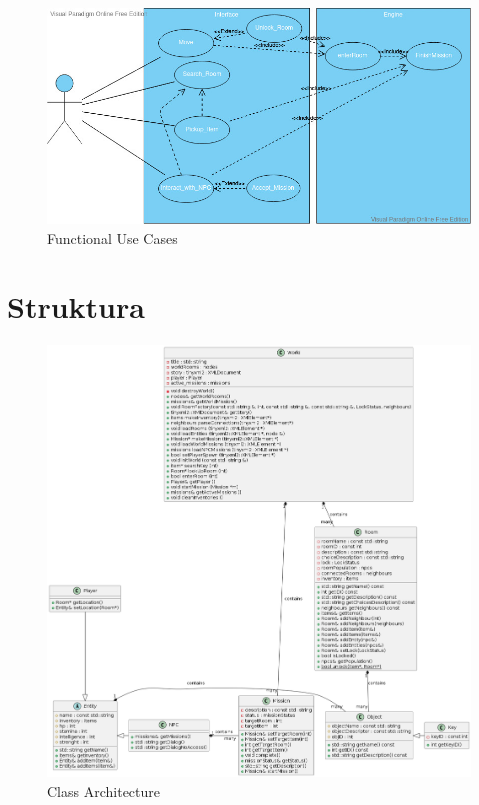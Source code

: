 \documentclass{scrarticle}
\begin{document}
\graphicspath{{../Planning/}}
\begin{figure}[H]\centering
    \includegraphics[width=1.0\columnwidth]{Functional_UseCase.jpg}
    \caption{Functional Use Cases}\label{fig:1}
\end{figure}

\section{Struktura}
\begin{figure}[H]
    \includegraphics[width=1\columnwidth]{class_architecture.png}
    \caption{Class Architecture}\label{fig:2}
\end{figure}
\end{document}
